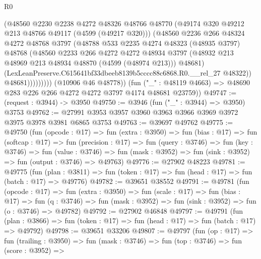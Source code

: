 \begin{lexlean}{R0}
\begin{coremodule}
                      (@48560
                        @2230
                        @2238
                        @4272
                        @48326
                        @48766
                        @48770
                        (@49174 @320 @49212 @213 @48766 @49117 (@4599 (@49217 @320)))
                        (@48560
                          @2236
                          @266
                          @48324
                          @4272
                          @48768
                          @3797
                          (@48788
                            @533
                            @2235
                            @4274
                            @48323
                            (@48935 @3797)
                            @48768
                            (@48560
                              @2233
                              @266
                              @4272
                              @4272
                              @48934
                              @3797
                              (@48932 @213 @48969 @213 @48934 @48870 (@4599 (@48974 @213)))
                              @48681)
                            (LexLeanPreserve.C615641bf33dbeeb8139b5cccc88c6868.R0.__rel_27 @48322))
                          @48681)))))))))
        (@10906 @46 @48778))
      (fun ("_" : @48119 @4663) => @48690 @283 @226 @266 @4272 @4272 @3797 @4174 @48681 @23759))
@49747 := (request : @3944) -> @3950
@49750 := @3946 (fun ("_" : @3944) => @3950) @3753
@49762 := @27991 @3953 @3957 @3960 @3963 @3966 @3969 @3972 @3975 @3978 @3981 @6865 @3753
@49763 := @39697 @49762
@49775 := @49750
    (fun (opcode : @17) =>
    fun (extra : @3950) =>
    fun (bias : @17) =>
    fun (softcap : @17) =>
    fun (precision : @17) =>
    fun (query : @3746) =>
    fun (key : @3746) =>
    fun (value : @3746) =>
    fun (mask : @3952) => fun (sink : @3952) => fun (output : @3746) => @49763)
@49776 := @27902 @48223
@49781 := @49775
    (fun (plan : @3811) => fun (token : @17) => fun (head : @17) => fun (batch : @17) => @49776)
@49782 := @39651 @38552
@49791 := @49781
    (fun (opcode : @17) =>
    fun (extra : @3950) =>
    fun (scale : @17) =>
    fun (bias : @17) =>
    fun (q : @3746) => fun (mask : @3952) => fun (sink : @3952) => fun (o : @3746) => @49782)
@49792 := @27902 @46848
@49797 := @49791
    (fun (plan : @3866) => fun (token : @17) => fun (head : @17) => fun (batch : @17) => @49792)
@49798 := @39651 @33206
@49807 := @49797
    (fun (op : @17) =>
    fun (trailing : @3950) =>
    fun (mask : @3746) =>
    fun (top : @3746) =>
    fun (score : @3952) =>

\end{coremodule}
\end{lexlean}
